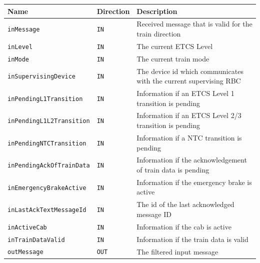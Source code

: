 \begin{minipage}{\linewidth}
  \scriptsize
  \begin{tabular}{| l | l | l |}
    \hline
    \textbf{Name}                    & \textbf{Direction} & \textbf{Description}                                        \\ 
    \hline
    \texttt{inMessage}               & \texttt{IN}        & Received message that is valid for the train direction      \\
    \texttt{inLevel}                 & \texttt{IN}        & The current ETCS Level                                      \\
    \texttt{inMode}                  & \texttt{IN}        & The current train mode                                      \\
    \texttt{inSupervisingDevice}     & \texttt{IN}        & The device id which communicates with the current supervising
  RBC                                                                                                                   \\
    \texttt{inPendingL1Transition}   & \texttt{IN}        & Information if an ETCS Level 1 transition is pending        \\
    \texttt{inPendingL1L2Transition} & \texttt{IN}        & Information if an ETCS Level 2/3 transition is pending      \\
    \texttt{inPendingNTCTransition}  & \texttt{IN}        & Information if a NTC transition is pending                  \\
    \texttt{inPendingAckOfTrainData} & \texttt{IN}        & Information if the acknowledgement of train data is pending \\
    \texttt{inEmergencyBrakeActive}  & \texttt{IN}        & Information if the emergency brake is active                \\
    \texttt{inLastAckTextMessageId}  & \texttt{IN}        & The id of the last acknowledged message ID                  \\
    \texttt{inActiveCab}             & \texttt{IN}        & Information if the cab is active                            \\
    \texttt{inTrainDataValid}        & \texttt{IN}        & Information if the train data is valid                      \\
    \texttt{outMessage}              & \texttt{OUT}       & The filtered input message                                  \\
    \hline
  \end{tabular}
  \label{tbl:InformationFilterInterface}
\end{minipage}

